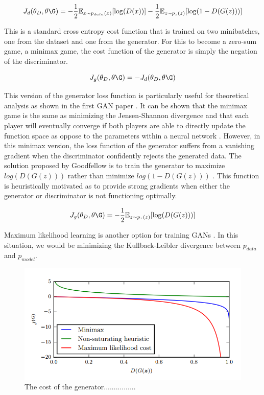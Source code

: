 \documentclass[11pt]{article}
\begin{document}
$$J_d(\theta_D,\theta\G) = -\frac{1}{2}\mathbb{E}_{x\sim p_{data}(x)}[\log(D(x))] - \frac{1}{2}\mathbb{E}_{z\sim p_{z}(z)}[\log(1-D(G(z)))]$$

This is a standard cross entropy cost function that is trained on two minibatches, one from the dataset and one from the generator. For this to become a zero-sum game, a minimax game, the cost function of the generator is simply the negation of the discriminator.

$$J_g(\theta_D,\theta\G) = -J_d(\theta_D,\theta\G)$$

This version of the generator loss function is particularly useful for theoretical analysis as shown in the first GAN paper \citep{2014arXiv1406.2661G}. It can be shown that the minimax game is the same as minimizing the Jensen-Shannon divergence and that each player will eventually converge if both players are able to directly update the function space as oppose to the parameters within a neural network \citep{2017arXiv170100160G}. However, in this minimax version, the loss function of the generator suffers from a vanishing gradient when the discriminator confidently rejects the generated data. The solution proposed by Goodfellow is to train the generator to maximize $log(D(G(z)))$ rather than minimize $log(1-D(G(z)))$ \citep{2014arXiv1406.2661G}. This function is heuristically motivated as to provide strong gradients when either the generator or discriminator is not functioning optimally.

$$J_g(\theta_D,\theta\G) = -\frac{1}{2}\mathbb{E}_{z\sim p_{z}(z)}[\log(D(G(z)))]$$

Maximum likelihood learning is another option for training GANs \citep{2017arXiv170100160G}. In this situation, we would be minimizing the Kullback-Leibler divergence between $p_{data}$ and $p_{model}$.

\begin{figure}
\centering
\includegraphics[scale=0.65]{costfunc}
\caption{The cost of the generator................}
\label{fig:Image to Image Examples}
\end{figure}
\end{document}
